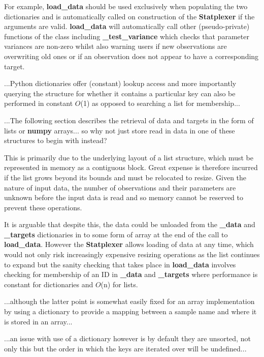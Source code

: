 For example, \textbf{load\_data} should be used exclusively when populating
the two dictionaries and is automatically called on construction of the
\textbf{Statplexer} if the arguments are valid. \textbf{load\_data} will
automatically call other (pseudo-private) functions of the class including
\textbf{\_test\_variance} which checks that parameter variances are non-zero
whilst also warning users if new observations are overwriting old ones or
if an observation does not appear to have a corresponding target.

...Python
dictionaries offer (constant) lookup access and more importantly querying the
structure for whether it contains a particular key can also be performed in
constant $O$(1) as opposed to searching a list for
membership\citep{py:timecomplexity}...

...The following section describes the retrieval of data and targets in the
form of lists or \textbf{numpy} arrays... so why not just store read in data
in one of these structures to begin with instead?

This is primarily due to the underlying layout of a list structure, which must
be represented in memory as a contiguous block. Great expense is therefore
incurred if the list grows beyond its bounds and must be relocated to resize.
Given the nature of input data, the number of observations and their parameters
are unknown before the input data is read and so memory cannot be reserved to
prevent these operations.

It is arguable that despite this, the data could be unloaded from the
\textbf{\_data} and \textbf{\_targets} dictionaries in to some form of array at
the end of the call to \textbf{load\_data}. However the \textbf{Statplexer}
allows loading of data at any time, which would not only risk increasingly
expensive resizing operations as the list continues to expand but the sanity
checking that takes place in \textbf{load\_data} involves checking for
membership of an ID in \textbf{\_data} and \textbf{\_targets} where performance
is constant for dictionaries and $O$(n) for lists.

...although the latter point is somewhat easily fixed for an array
implementation by using a dictionary to provide a mapping between a sample name
and where it is stored in an array...

...an issue with use of a dictionary however is by default they are unsorted,
not only this but the order in which the keys are iterated over will be
undefined...


